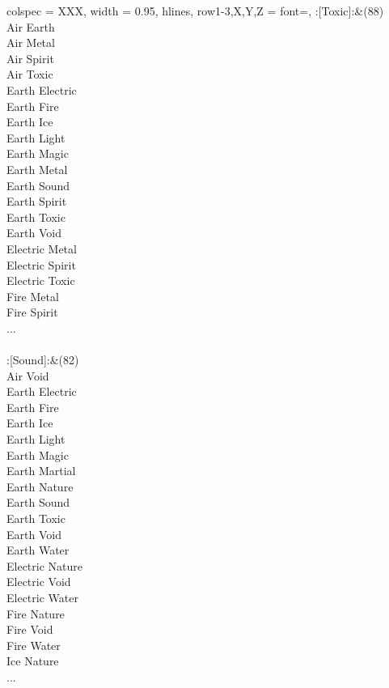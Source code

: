 \twocolumn
\begin{longtblr}[
	caption = {1v2 Attacking Ineffective},
	label = {1v2-Attacking-Ineffective},
]{
	colspec = {XXX}, width = 0.95\linewidth,
	hlines,
	row{1-3,X,Y,Z} = {font=\bfseries},
}
	:[Toxic]:&{(88)\\
	Air Earth \\
	Air Metal \\
	Air Spirit \\
	Air Toxic \\
	Earth Electric \\
	Earth Fire \\
	Earth Ice \\
	Earth Light \\
	Earth Magic \\
	Earth Metal \\
	Earth Sound \\
	Earth Spirit \\
	Earth Toxic \\
	Earth Void \\
	Electric Metal \\
	Electric Spirit \\
	Electric Toxic \\
	Fire Metal \\
	Fire Spirit \\
	...\\
	}\\

	:[Sound]:&{(82)\\
	Air Void \\
	Earth Electric \\
	Earth Fire \\
	Earth Ice \\
	Earth Light \\
	Earth Magic \\
	Earth Martial \\
	Earth Nature \\
	Earth Sound \\
	Earth Toxic \\
	Earth Void \\
	Earth Water \\
	Electric Nature \\
	Electric Void \\
	Electric Water \\
	Fire Nature \\
	Fire Void \\
	Fire Water \\
	Ice Nature \\
	...\\
	}\\


\end{longtblr}
